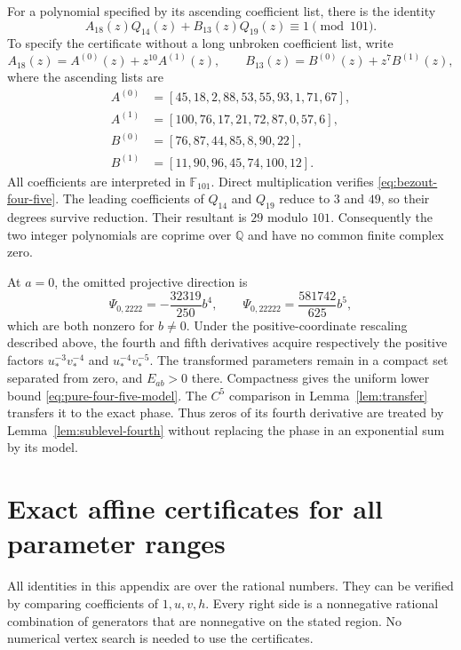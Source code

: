 \documentclass[11pt,a4paper]{article}
\numberwithin{equation}{section}
\theoremstyle{remark}
\begin{document}
For a polynomial specified by its ascending coefficient list, there is
the identity
\begin{equation}\label{eq:bezout-four-five}
 A_{18}(z)Q_{14}(z)+B_{13}(z)Q_{19}(z)\equiv1\pmod{101}.
\end{equation}
To specify the certificate without a long unbroken coefficient list, write
\[
 A_{18}(z)=A^{(0)}(z)+z^{10}A^{(1)}(z),\qquad
 B_{13}(z)=B^{(0)}(z)+z^7B^{(1)}(z),
\]
where the ascending lists are
\begin{align*}
 A^{(0)}&=[45,18,2,88,53,55,93,1,71,67],\\
 A^{(1)}&=[100,76,17,21,72,87,0,57,6],\\
 B^{(0)}&=[76,87,44,85,8,90,22],\\
 B^{(1)}&=[11,90,96,45,74,100,12].
\end{align*}
All coefficients are interpreted in $\mathbb F_{101}$. Direct
multiplication verifies \eqref{eq:bezout-four-five}. The leading
coefficients of $Q_{14}$ and $Q_{19}$ reduce to $3$ and $49$, so their
degrees survive reduction. Their resultant is $29$ modulo $101$.
Consequently the two integer polynomials are coprime over $\mathbb Q$
and have no common finite complex zero.

At $a=0$, the omitted projective direction is
\begin{equation}\label{eq:four-five-axis}
 \Psi_{0,2222}=-\frac{32319}{250}b^4,\qquad
 \Psi_{0,22222}=\frac{581742}{625}b^5,
\end{equation}
which are both nonzero for $b\ne0$.
Under the positive-coordinate rescaling described above, the fourth
and fifth derivatives acquire respectively the positive factors
$u_*^{-3}v_*^{-4}$ and $u_*^{-4}v_*^{-5}$.
The transformed parameters remain in a compact set separated from zero,
and $E_{ab}>0$ there. Compactness gives the uniform lower bound
\eqref{eq:pure-four-five-model}. The $C^5$ comparison in
Lemma~\ref{lem:transfer} transfers it to the exact phase. Thus zeros
of its fourth derivative are treated by Lemma~\ref{lem:sublevel-fourth}
without replacing the phase in an exponential sum by its model.

\section{Exact affine certificates for all parameter ranges}
\label{app:affine}
All identities in this appendix are over the rational numbers. They can be
verified by comparing coefficients of $1,u,v,h$. Every right side is a
nonnegative rational combination of generators that are nonnegative on
the stated region. No numerical vertex search is needed to use the
certificates.
\end{document}
